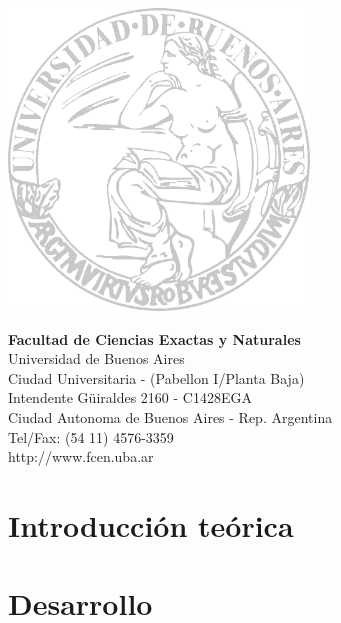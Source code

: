 \documentclass[10pt, a4paper, english, spanish]{article}
\begin{document}
\raggedright

\begin{multicols}{2}
\includegraphics[width=8cm]{caratula/logo-uba.png}

\columnbreak
\vspace*{3.5cm}
\raggedleft
\textbf{Facultad de Ciencias Exactas y Naturales}\\
Universidad de Buenos Aires\\
\small
Ciudad Universitaria - (Pabellon I/Planta Baja)\\
Intendente G\"uiraldes 2160 - C1428EGA\\
Ciudad Autonoma de Buenos Aires - Rep. Argentina\\
Tel/Fax: (54 11) 4576-3359\\
http://www.fcen.uba.ar
\end{multicols}

\restoregeometry

\clearpage


\tableofcontents

\vspace{3cm}

\clearpage

\setlength{\parindent}{10pt}

\section{Introducción teórica}

\clearpage

\section{Desarrollo}


\clearpage
\end{document}
